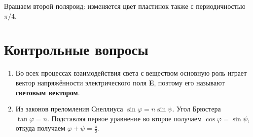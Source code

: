 	Вращаем второй поляроид: изменяется цвет пластинок также с периодичностью  $\pi/4$.
	
	\section*{Контрольные вопросы}
	
	\begin{enumerate}
		\item Во всех процессах взаимодействия света с веществом основную роль играет вектор напряжённости электрического поля \textbf{E}, поэтому его называют \textbf{световым вектором}.
		
		
		
		\item Из законов преломления Снеллиуса $\sin \varphi = n \sin \psi$. Угол Брюстера $\tan \varphi = n$. Подставляя первое уравнение во второе получаем $\cos \varphi = \sin \psi$, откуда получаем $\displaystyle \varphi + \psi = \frac{\pi}{2}$.
	\end{enumerate}

